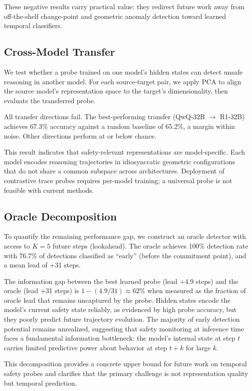 These negative results carry practical value: they redirect future work away from off-the-shelf change-point and geometric anomaly detection toward learned temporal classifiers.

\subsection{Cross-Model Transfer}
\label{sec:transfer}

We test whether a probe trained on one model's hidden states can detect unsafe reasoning in another model. For each source-target pair, we apply PCA to align the source model's representation space to the target's dimensionality, then evaluate the transferred probe.

All transfer directions fail. The best-performing transfer (QwQ-32B $\rightarrow$ R1-32B) achieves 67.3\% accuracy against a random baseline of 65.2\%, a margin within noise. Other directions perform at or below chance.

This result indicates that safety-relevant representations are model-specific. Each model encodes reasoning trajectories in idiosyncratic geometric configurations that do not share a common subspace across architectures. Deployment of contrastive trace probes requires per-model training; a universal probe is not feasible with current methods.

\subsection{Oracle Decomposition}
\label{sec:oracle}

To quantify the remaining performance gap, we construct an oracle detector with access to $K{=}5$ future steps (lookahead). The oracle achieves 100\% detection rate with 76.7\% of detections classified as ``early'' (before the commitment point), and a mean lead of +31 steps.

The information gap between the best learned probe (lead +4.9 steps) and the oracle (lead +31 steps) is $1 - (4.9/31) \approx 62\%$ when measured as the fraction of oracle lead that remains uncaptured by the probe. Hidden states encode the model's current safety state reliably, as evidenced by high probe accuracy, but they poorly predict future trajectory evolution. The majority of early detection potential remains unrealized, suggesting that safety monitoring at inference time faces a fundamental information bottleneck: the model's internal state at step $t$ carries limited predictive power about behavior at step $t{+}k$ for large $k$.

This decomposition provides a concrete upper bound for future work on temporal safety probes and clarifies that the primary challenge is not representation quality but temporal prediction.

